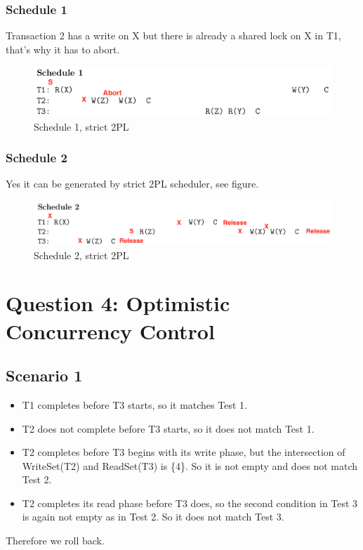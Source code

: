 \documentclass[12pt,a4paper]{article}
\begin{document}
\subsubsection{Schedule 1}
Transaction 2 has a write on X but there is already a shared lock on X in T1, that's why it has to abort.
\begin{figure}[!htb]
	\center
	\includegraphics[width=\textwidth]{img/Schedule1_strict2PL}
	\caption{Schedule 1, strict 2PL}
\end{figure}


\subsubsection{Schedule 2}
Yes it can be generated by strict 2PL scheduler, see figure.
\begin{figure}[!htb]
	\center
	\includegraphics[width=\textwidth]{img/Schedule2_strict2PL}
	\caption{Schedule 2, strict 2PL}
\end{figure}

\section{Question 4: Optimistic Concurrency Control}
\subsection{Scenario 1}
\begin{itemize}
\item T1 completes before T3 starts, so it matches Test 1.
\item T2 does not complete before T3 starts, so it does not match Test 1.
\item T2 completes before T3 begins with its write phase, but the intersection of WriteSet(T2) and ReadSet(T3) is \{4\}. So it is not empty and does not match Test 2.
\item T2 completes its read phase before T3 does, so the second condition in Test 3 is again not empty as in Test 2. So it does not match Test 3.
\end{itemize}
Therefore we roll back.
\end{document}
